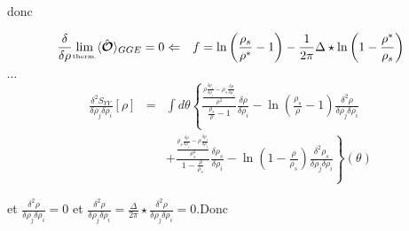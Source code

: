 	donc 
	
	\begin{eqnarray} 
		\frac{\delta}{\delta \rho}	\underset{\mbox{\tiny therm.}}{\lim} \langle \hat{\bm{\mathcal{O}}}\rangle_{GGE} = 0 & \Leftarrow & f = \ln \left ( \frac{ \rho_s}{ \rho^\ast } - 1 \right ) - \frac{1}{2 \pi} \Delta \star \ln \left ( 1 - \frac{ \rho^\ast }{ \rho_s}\right )		
	\end{eqnarray}
	
 
	
	{\color{red} $\cdots$}\\
	
	\begin{eqnarray}
		\frac{ \delta^2 S_{YY} }{ \delta \rho_j\delta \rho_i } [\rho ]  & = &\int  d\theta\left \{ \frac{\frac{\rho \frac{\delta \rho_s}{\delta \rho_j}- \rho_s\frac{\delta \rho}{\delta \rho_j}}{\rho^2}}{\frac{\rho_s}{\rho} -1}\frac{\delta \rho}{\delta \rho_i}  - \ln \left ( \frac{ \rho_s}{ \rho} - 1 \right )\frac{\delta^2 \rho}{\delta \rho_j\delta \rho_i} \right .\\
		& & +\left .  \frac{\frac{\rho_s \frac{\delta \rho}{\delta \rho_j}- \rho\frac{\delta \rho_s}{\delta \rho_j}}{\rho_s^2}}{1 - \frac{\rho}{\rho_s}}\frac{\delta \rho_s}{\delta \rho_i}  - \ln \left (1- \frac{ \rho}{ \rho_s}  \right )\frac{\delta^2 \rho_s}{\delta \rho_j\delta \rho_i}\right \} ( \theta ) 
	\end{eqnarray}
	
	et $\frac{\delta^2 \rho}{\delta \rho_j\delta \rho_i} =0 $ et $\frac{\delta^2 \rho}{\delta \rho_j\delta \rho_i} = \frac{\Delta}{2\pi} \star \frac{\delta^2 \rho}{\delta \rho_j\delta \rho_i} = 0 $.Donc 
	
